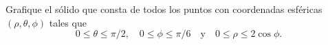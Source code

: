 \item Grafique el sólido que consta de todos los puntos con coordenadas esféricas $(\rho, \theta, \phi)$ tales que
\[
0 \le \theta \le \pi/2, \quad 0 \le \phi \le \pi/6 \quad \text{y} \quad 0 \le \rho \le 2 \cos \phi.
\]
